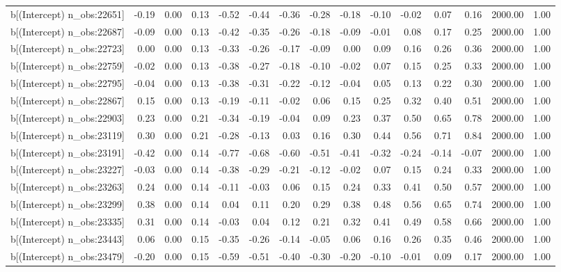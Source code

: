 \begin{table}[ht]
\begin{tabular}{rrrrrrrrrrrrrrr}
  b[(Intercept) n\_obs:22651] & -0.19 & 0.00 & 0.13 & -0.52 & -0.44 & -0.36 & -0.28 & -0.18 & -0.10 & -0.02 & 0.07 & 0.16 & 2000.00 & 1.00 \\ 
  b[(Intercept) n\_obs:22687] & -0.09 & 0.00 & 0.13 & -0.42 & -0.35 & -0.26 & -0.18 & -0.09 & -0.01 & 0.08 & 0.17 & 0.25 & 2000.00 & 1.00 \\ 
  b[(Intercept) n\_obs:22723] & 0.00 & 0.00 & 0.13 & -0.33 & -0.26 & -0.17 & -0.09 & 0.00 & 0.09 & 0.16 & 0.26 & 0.36 & 2000.00 & 1.00 \\ 
  b[(Intercept) n\_obs:22759] & -0.02 & 0.00 & 0.13 & -0.38 & -0.27 & -0.18 & -0.10 & -0.02 & 0.07 & 0.15 & 0.25 & 0.33 & 2000.00 & 1.00 \\ 
  b[(Intercept) n\_obs:22795] & -0.04 & 0.00 & 0.13 & -0.38 & -0.31 & -0.22 & -0.12 & -0.04 & 0.05 & 0.13 & 0.22 & 0.30 & 2000.00 & 1.00 \\ 
  b[(Intercept) n\_obs:22867] & 0.15 & 0.00 & 0.13 & -0.19 & -0.11 & -0.02 & 0.06 & 0.15 & 0.25 & 0.32 & 0.40 & 0.51 & 2000.00 & 1.00 \\ 
  b[(Intercept) n\_obs:22903] & 0.23 & 0.00 & 0.21 & -0.34 & -0.19 & -0.04 & 0.09 & 0.23 & 0.37 & 0.50 & 0.65 & 0.78 & 2000.00 & 1.00 \\ 
  b[(Intercept) n\_obs:23119] & 0.30 & 0.00 & 0.21 & -0.28 & -0.13 & 0.03 & 0.16 & 0.30 & 0.44 & 0.56 & 0.71 & 0.84 & 2000.00 & 1.00 \\ 
  b[(Intercept) n\_obs:23191] & -0.42 & 0.00 & 0.14 & -0.77 & -0.68 & -0.60 & -0.51 & -0.41 & -0.32 & -0.24 & -0.14 & -0.07 & 2000.00 & 1.00 \\ 
  b[(Intercept) n\_obs:23227] & -0.03 & 0.00 & 0.14 & -0.38 & -0.29 & -0.21 & -0.12 & -0.02 & 0.07 & 0.15 & 0.24 & 0.33 & 2000.00 & 1.00 \\ 
  b[(Intercept) n\_obs:23263] & 0.24 & 0.00 & 0.14 & -0.11 & -0.03 & 0.06 & 0.15 & 0.24 & 0.33 & 0.41 & 0.50 & 0.57 & 2000.00 & 1.00 \\ 
  b[(Intercept) n\_obs:23299] & 0.38 & 0.00 & 0.14 & 0.04 & 0.11 & 0.20 & 0.29 & 0.38 & 0.48 & 0.56 & 0.65 & 0.74 & 2000.00 & 1.00 \\ 
  b[(Intercept) n\_obs:23335] & 0.31 & 0.00 & 0.14 & -0.03 & 0.04 & 0.12 & 0.21 & 0.32 & 0.41 & 0.49 & 0.58 & 0.66 & 2000.00 & 1.00 \\ 
  b[(Intercept) n\_obs:23443] & 0.06 & 0.00 & 0.15 & -0.35 & -0.26 & -0.14 & -0.05 & 0.06 & 0.16 & 0.26 & 0.35 & 0.46 & 2000.00 & 1.00 \\ 
  b[(Intercept) n\_obs:23479] & -0.20 & 0.00 & 0.15 & -0.59 & -0.51 & -0.40 & -0.30 & -0.20 & -0.10 & -0.01 & 0.09 & 0.17 & 2000.00 & 1.00 \\ 

\end{tabular}
\end{table}
